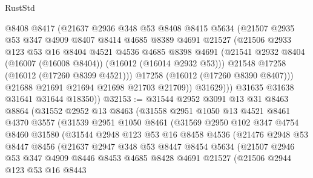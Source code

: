 \begin{lexlean}{RustStd}
\begin{coremodule}
                @8408
                @8417
                (@21637
                  @2936
                  @348
                  @53
                  @8408
                  @8415
                  @5634
                  (@21507
                    @2935
                    @53
                    @347
                    @4909
                    @8407
                    @8414
                    @4685
                    @8389
                    @4691
                    @21527
                    (@21506
                      @2933
                      @123
                      @53
                      @16
                      @8404
                      @4521
                      @4536
                      @4685
                      @8398
                      @4691
                      (@21541 @2932 @8404 (@16007 (@16008 @8404)) (@16012 (@16014 @2932 @53)))
                      @21548
                      @17258
                      (@16012 (@17260 @8399 @4521)))
                    @17258
                    (@16012 (@17260 @8390 @8407)))
                  @21688
                  @21691
                  @21694
                  @21698
                  @21703
                  @21709))
              @31629)))
        @31635
        @31638
        @31641
        @31644
        @18350))
@32153 := @31544
    @2952
    @3091
    @13
    @31
    @8463
    @8864
    (@31552
      @2952
      @13
      @8463
      (@31558
        @2951
        @1050
        @13
        @4521
        @8461
        @4370
        @3557
        (@31539
          @2951
          @1050
          @8461
          (@31569
            @2950
            @102
            @347
            @4754
            @8460
            @31580
            (@31544
              @2948
              @123
              @53
              @16
              @8458
              @4536
              (@21476
                @2948
                @53
                @8447
                @8456
                (@21637
                  @2947
                  @348
                  @53
                  @8447
                  @8454
                  @5634
                  (@21507
                    @2946
                    @53
                    @347
                    @4909
                    @8446
                    @8453
                    @4685
                    @8428
                    @4691
                    @21527
                    (@21506
                      @2944
                      @123
                      @53
                      @16
                      @8443

\end{coremodule}
\end{lexlean}
